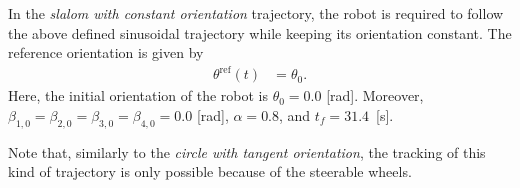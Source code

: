 In the \textit{slalom with constant orientation} trajectory, the robot is required to follow the above defined sinusoidal trajectory while keeping its orientation constant. The reference orientation is given by
\begin{subequations}
\begin{align*}
    \theta^{\mathrm{ref}}(t) &= \theta_0.
\end{align*}
\end{subequations}
Here, the initial orientation of the robot is $\theta_0=0.0$ [rad]. Moreover, $\beta_{1,0}=\beta_{2,0}=\beta_{3,0}=\beta_{4,0}=0.0$ [rad], $\alpha=0.8$, and $t_f=31.4$~[s].

Note that, similarly to the \textit{circle with tangent orientation}, the tracking of this kind of trajectory is only possible because of the steerable wheels.

